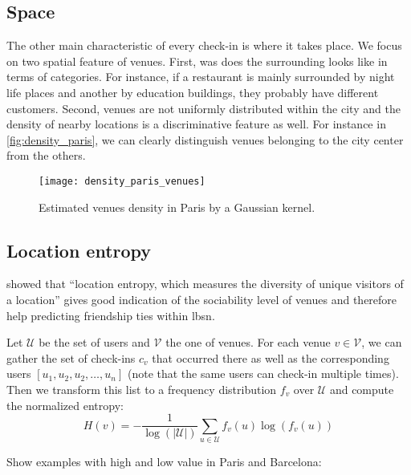 \restoregeometry

\subsection{Space}

The other main characteristic of every check-in is where it takes place. We
focus on two spatial feature of venues. First, was does the surrounding looks
like in terms of categories. For instance, if a restaurant is mainly
surrounded by night life places and another by education buildings, they
probably have different customers. Second, venues are not uniformly
distributed within the city and the density of nearby locations is a
discriminative feature as well. For instance in \autoref{fig:density_paris},
we can clearly distinguish venues belonging to the city center from the
others.

\begin{figure}[hbtp]
\texttt{[image: density\_paris\_venues]}
\caption[Venue density in Paris]{Estimated venues density in Paris by a
	Gaussian kernel.\label{fig:density_paris}}
\end{figure}

\subsection{Location entropy}

\Textcite{Entropy10} showed that \enquote{location entropy, which measures the
diversity of unique visitors of a location} gives good indication of the
sociability level of venues and therefore help predicting friendship ties within
\gls{lbsn}.

Let $\mathcal{U}$ be the set of users and $\mathcal{V}$ the one of venues. For
each venue $v \in \mathcal{V}$, we can gather the set of check-ins $c_v$ that
occurred there as well as the corresponding users $[u_1, u_2, u_2, \ldots,
u_n]$ (note that the same users can check-in multiple times). Then we
transform this list to a frequency distribution $f_v$ over $\mathcal{U}$ and
compute the normalized entropy: \[
    H(v) = -\frac{1}{\log\left(\left| \mathcal{U}\right|\right)}
\sum_{u\in \mathcal{U}} f_v(u) \log(f_v(u)) \]

Show examples with high and low value in Paris and Barcelona:

